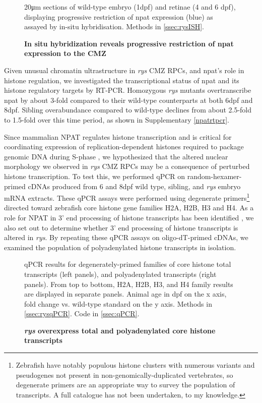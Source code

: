 \begin{figure}[!h]
    \caption{{\bf In situ hybridization reveals progressive restriction of npat expression to the CMZ}}
    20\si{\micro\metre} sections of wild-type embryo (1dpf) and retinae (4 and 6 dpf), displaying progressive restriction of npat expression (blue) as assayed by in-situ hybridisation.
    Methods in \autoref{ssec:rysISH}.
    \label{npatISH}
\end{figure}

Given unusual chromatin ultrastructure in \textit{rys} CMZ RPCs, and npat's role in histone regulation, we investigated the transcriptional status of npat and its histone regulatory targets by RT-PCR. Homozygous \textit{rys} mutants overtranscribe npat by about 3-fold compared to their wild-type counterparts at both 6dpf and 8dpf. Sibling overabundance compared to wild-type declines from about 2.5-fold to 1.5-fold over this time period, as shown in Supplementary \autoref{npatrtpcr}.

Since mammalian NPAT regulates histone transcription and is critical for coordinating expression of replication-dependent histones required to package genomic DNA during S-phase \cite{Zhao2000}, we hypothesized that the altered nuclear morphology we observed in \textit{rys} CMZ RPCs may be a consequence of perturbed histone transcription. To test this, we performed qPCR on random-hexamer-primed cDNAs produced from 6 and 8dpf wild type, sibling, and \textit{rys} embryo mRNA extracts. These qPCR assays were performed using degenerate primers\footnote{Zebrafish have notably populous histone clusters with numerous variants and pseudogenes not present in non-genomically-duplicated vertebrates, so degenerate primers are an appropriate way to survey the population of transcripts. A full catalogue has not been undertaken, to my knowledge.} directed toward zebrafish core histone gene families H2A, H2B, H3 and H4. As a role for NPAT in 3’ end processing of histone transcripts has been identified \cite{Pirngruber2010}, we also set out to determine whether 3’ end processing of histone transcripts is altered in \textit{rys}. By repeating these qPCR assays on oligo-dT-primed cDNAs, we examined the population of polyadenylated histone transcripts in isolation. 

\begin{figure}[!h]
    \caption{{\bf \textit{rys} overexpress total and polyadenylated core histone transcripts}}
    qPCR results for degenerately-primed families of core histone total transcripts (left panels), and polyadenylated transcripts (right panels). From top to bottom, H2A, H2B, H3, and H4 family results are displayed in separate panels. Animal age in dpf on the x axis, fold change vs. wild-type standard on the y axis.    
    \label{histonertpcr}
    Methods in \autoref{ssec:rysqPCR}.
    Code in \autoref{ssec:qPCR}.
\end{figure}

